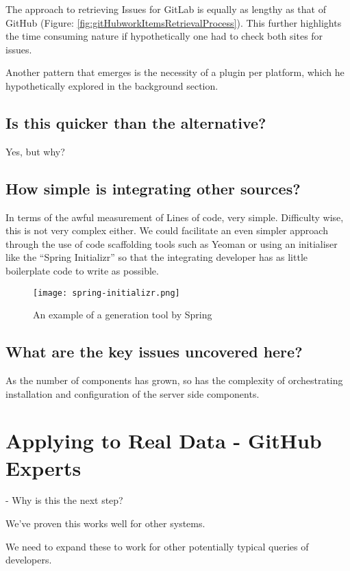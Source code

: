 The approach to retrieving Issues for GitLab is equally as lengthy as that of GitHub (Figure: \ref{fig:gitHubworkItemsRetrievalProcess}). This further highlights the time consuming nature if hypothetically one had to check both sites for issues.

Another pattern that emerges is the necessity of a plugin per platform, which he hypothetically explored in the background section.

\subsection{Is this quicker than the alternative?}

Yes, but why?

\subsection{How simple is integrating other sources?}

In terms of the awful measurement of Lines of code, very simple. Difficulty wise, this is not very complex either. We could facilitate an even simpler approach through the use of code scaffolding tools such as Yeoman or using an initialiser like the ``Spring Initializr'' so that the integrating developer has as little boilerplate code to write as possible.

\begin{figure}[h!]
	\centering
	\texttt{[image: spring-initializr.png]}
	\label{fig:springExample}
	\caption{An example of a generation tool by Spring}
\end{figure}

\subsection{What are the key issues uncovered here?}

As the number of components has grown, so has the complexity of orchestrating installation and configuration of the server side components. 

\section{Applying to Real Data - GitHub Experts}

- Why is this the next step?

We've proven this works well for other systems.

We need to expand these to work for other potentially typical queries of developers.

